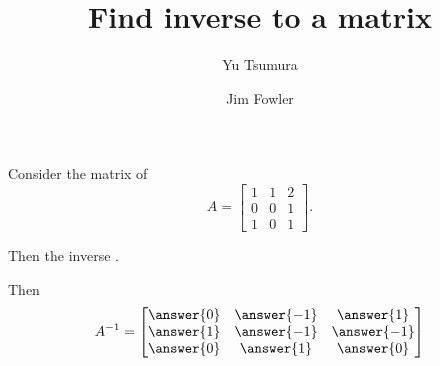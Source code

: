 \documentclass{ximera}
\title{Find inverse to a matrix}
\author{Yu Tsumura \and Jim Fowler}
\begin{document}
\begin{problem}
Consider the matrix of
\[A=\begin{bmatrix}
    1 & 1 & 2 \\
    0 &0 &1 \\
    1 & 0 & 1
  \end{bmatrix}.\]

Then the inverse .

\begin{problem}
  Then
  \[
    A^{-1} = \begin{bmatrix}
      \answer{0} & \answer{-1} & \answer{1} \\
      \answer{1} & \answer{-1} & \answer{-1} \\
      \answer{0} & \answer{1} & \answer{0}
    \end{bmatrix}
  \]
\end{problem}

\end{problem}
	
\end{document}
